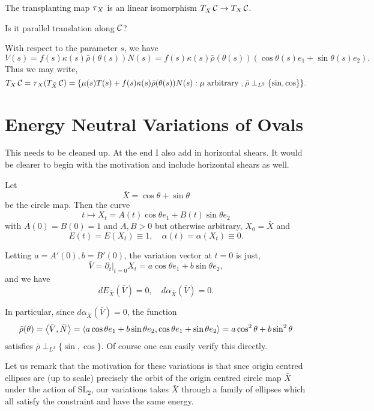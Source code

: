 \documentclass[12pt]{article}
\begin{document}
The transplanting map \(\operatorname{\tau}_X\) is an linear isomorphism \(T_{\bar{X}} \operatorname{\mathcal{C}} \to T_X \operatorname{\mathcal{C}}\).

{\color{red} Is it parallel translation along \(\operatorname{\mathcal{C}}\)?}

With respect to the parameter \(s\), we have
\[
V(s) = f(s) \kappa(s) \bar{\rho}(\theta(s)) N(s) = f(s) \kappa(s) \bar{\rho}(\theta(s))(\cos\theta(s) e_1 + \sin\theta(s) e_2).
\]
Thus we may write,
\[
T_X \operatorname{\mathcal{C}} = \operatorname{\tau}_X(T_{\bar{X}} \operatorname{\mathcal{C}}) = \{\mu(s) T(s) + f(s) \kappa(s) \bar{\rho}(\theta(s)) N(s) : \mu \text{ arbitrary }, \bar{\rho} \perp_{L^2} \{\sin, \cos\}\}.
\]

\section{Energy Neutral Variations of Ovals}

{\color{red} This needs to be cleaned up. At the end I also add in horizontal shears. It would be clearer to begin with the motivation and include horizontal shears as well.}

Let
\[
\bar{X} = \cos\theta + \sin \theta
\]
be the circle map. Then the curve
\[
t \mapsto X_t = A(t) \cos\theta e_1 + B(t) \sin \theta e_2
\]
with \(A(0) = B(0) = 1\) and \(A, B > 0\) but otherwise arbitrary, \(X_0 = \bar{X}\) and
\[
E(t) = E(X_t) \equiv 1, \quad \alpha(t) = \alpha(X_t) \equiv 0.
\]

Letting \(a = A'(0), b = B'(0)\), the variation vector at \(t = 0\) is just,
\[
\bar{V} = \partial_t|_{t=0} X_t = a \cos\theta e_1 + b \sin\theta e_2,
\]
and we have
\[
dE_{\bar{X}} (\bar{V}) = 0, \quad d\alpha_{\bar{X}} (\bar{V}) = 0.
\]

In particular, since \(d\alpha_{\bar{X}} (\bar{V}) = 0\), the function
\[
\bar{\rho} (\theta) = \left\langle{\bar{V}},{\bar{N}}\right\rangle = \left\langle{a \cos\theta e_1 + b \sin\theta e_2},{\cos\theta e_1 + \sin\theta e_2}\right\rangle = a \cos^2\theta + b \sin^2\theta
\]
satisfies \(\bar{\rho} \perp_{L^2} \{\sin, \cos\}\). Of course one can easily verify this directly.

Let us remark that the motivation for these variations is that snce origin centred ellipses are (up to scale) precisely the orbit of the origin centred circle map \(\bar{X}\) under the action of \(\text{SL}_2\), our variations takes \(\bar{X}\) through a family of ellipses which all satisfy the constraint and have the same energy.
\end{document}
